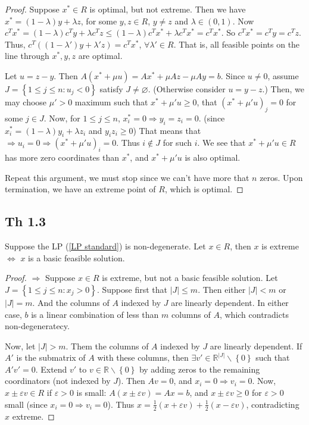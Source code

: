 \begin{proof}
    Suppose $x^*\in R$ is optimal, but not extreme. Then we have $x^* = (1-\lambda)y + \lambda z$, for some $y, z\in R$, $y\neq z$ and $\lambda \in (0, 1)$. Now $c^Tx^* = (1-\lambda)c^Ty + \lambda c^T z\le (1-\lambda)c^Tx^* + \lambda c^T x^* = c^T x^*$. So $c^Tx^* = c^Ty = c^Tz$. Thus, $c^T\left( (1-\lambda')y+\lambda'z \right) = c^Tx^*$, $\forall \lambda'\in R$. That is, all feasible points on the line through $x^*, y, z$ are optimal.

Let $u = z-y$. Then $A(x^*+\mu u) = Ax^* + \mu Az - \mu Ay = b$. Since $u\neq 0$, assume $J = \left\lbrace 1\le j\le n: u_j <0 \right\rbrace$ satisfy $J\neq\varnothing$. (Otherwise consider $u = y-z$.) Then, we may choose $\mu'>0$ maximum such that $x^*+\mu'u \ge 0$, that $(x^* + \mu' u)_j = 0$ for some $j\in J$. Now, for $1\le j\le n$, $x^*_i = 0\Longrightarrow y_i = z_i = 0$. (since $x^*_i = (1-\lambda)y_i + \lambda z_i$ and $y_iz_i\ge 0$) That means that $\Longrightarrow u_i = 0\Longrightarrow (x^* +\mu'u)_i = 0$. Thus $i\notin J$ for such $i$. We see that $x^* + \mu' u\in R$ has more zero coordinates than $x^*$, and $x^* + \mu' u$ is also optimal.

Repeat this argument, we must stop since we can't have more that $n$ zeros. Upon termination, we have an extreme point of $R$, which is optimal.
\end{proof}

\subsection{Th 1.3}\label{Th 1.3}
\begin{theorem}
    Suppose the LP (\ref{LP standard}) is non-degenerate. Let $x\in R$, then $x$ is extreme $\Longleftrightarrow$ $x$ is a basic feasible solution.
\end{theorem}
\begin{proof}
    $\Longrightarrow$ Suppose $x\in R$ is extreme, but not a basic feasible solution. Let $J = \left\lbrace 1\le j\le n:x_j>0 \right\rbrace$. Suppose first that $|J|\le m$. Then either $|J|< m $ or $|J| = m$. And the columns of $A$ indexed by $J$ are linearly dependent. In either case, $b$ is a linear combination of less than $m$ columns of $A$, which contradicts non-degeneratecy.

    Now, let $|J|>m$. Them the columns of $A$ indexed by $J$ are linearly dependent. If $A'$ is the submatrix of $A$ with these columns, then $\exists v'\in \mathbb{R}^{|J|}\backslash \left\lbrace 0 \right\rbrace$ such that $A'v' = 0$. Extend $v'$ to $v\in \mathbb{R}\backslash\left\lbrace 0 \right\rbrace$ by adding zeros to the remaining coordinators (not indexed by $J$). Then $Av = 0$, and $x_i =0 \Longrightarrow v_i = 0$. Now, $x\pm \varepsilon v\in R$ if $\varepsilon > 0$ is small: $A(x\pm \varepsilon v) = Ax = b$, and $x\pm\varepsilon v\ge 0$ for $\varepsilon>0$ small (since $x_i = 0 \Longrightarrow v_i = 0$). Thus $x = \frac{1}{2}(x+\varepsilon v) + \frac{1}{2} (x - \varepsilon v)$, contradicting $x$ extreme.
\end{proof}

